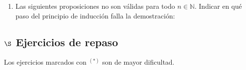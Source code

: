 \documentclass[a4paper,12pt,twoside,spanish,reqno]{amsbook}
\numberwithin{equation}{section}
\begin{document}
\begin{enumerate}
\item Las siguientes proposiciones no son válidas para todo $n \in {\mathbb N}$. Indicar en qué paso del principio de inducción falla la demostración:
\end{enumerate}

\subsection*{$\S$ Ejercicios de repaso} Los ejercicios marcados con ${}^{(*)}$ son de mayor dificultad.
\end{document}
